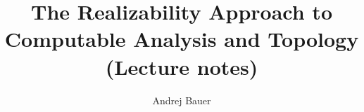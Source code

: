\documentclass[11pt,a4paper,twoside]{book}
\newcommand{\clearemptydoublepage}{\newpage{\pagestyle{empty}\cleardoublepage}}
\begin{document}
\title{
  The Realizability Approach to\\
  Computable Analysis and Topology\\
  (Lecture notes)
}

\author{Andrej Bauer}

\maketitle


\clearemptydoublepage

{
\renewcommand{\markboth}[2]{}
\tableofcontents
}








\clearemptydoublepage



{
\renewcommand{\markboth}[2]{}

}
\end{document}
